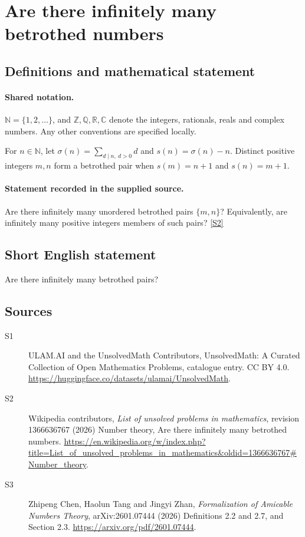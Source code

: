 \documentclass[11pt]{article}
\newcommand{\sref}[2]{\hyperlink{source:#1:#2}{[S#2]}}
\begin{document}
\section{Are there infinitely many betrothed numbers}\label{statement}

\subsection{Definitions and mathematical statement}

\paragraph{Shared notation.}$\mathbb N=\{1,2,\ldots\}$, and $\mathbb Z,\mathbb Q,\mathbb R,\mathbb C$ denote the integers, rationals, reals and complex numbers. Any other conventions are specified locally.


For $n\in\mathbb N$, let $\sigma(n)=\sum_{d\mid n,\ d>0}d$ and $s(n)=\sigma(n)-n$. Distinct positive integers $m,n$ form a betrothed pair when $s(m)=n+1$ and $s(n)=m+1$.
\paragraph{Statement recorded in the supplied source.}
Are there infinitely many unordered betrothed pairs $\{m,n\}$? Equivalently, are infinitely many positive integers members of such pairs? \sref{statement}{2}
\subsection{Short English statement}
Are there infinitely many betrothed pairs?
\subsection{Sources}
\begin{description}
\item[\hypertarget{source:statement:1}{S1}] ULAM.AI and the UnsolvedMath Contributors, UnsolvedMath: A Curated Collection of Open Mathematics Problems, catalogue entry. CC BY 4.0. \url{https://huggingface.co/datasets/ulamai/UnsolvedMath}.
\item[\hypertarget{source:statement:2}{S2}] Wikipedia contributors, \emph{List of unsolved problems in mathematics}, revision 1366636767 (2026) Number theory, Are there infinitely many betrothed numbers. \url{https://en.wikipedia.org/w/index.php?title=List_of_unsolved_problems_in_mathematics&oldid=1366636767#Number_theory}.
\item[\hypertarget{source:statement:3}{S3}] Zhipeng Chen, Haolun Tang and Jingyi Zhan, \emph{Formalization of Amicable Numbers Theory}, arXiv:2601.07444 (2026) Definitions 2.2 and 2.7, and Section 2.3. \url{https://arxiv.org/pdf/2601.07444}.
\end{description}
\label{end:statement}
\end{document}
